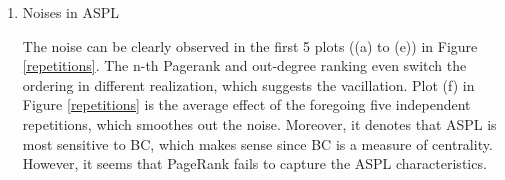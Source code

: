 \documentclass{article}
\begin{document}
\begin{enumerate}
\item Noises in ASPL\\

\par The noise can be clearly observed in the first 5 plots ((a) to (e)) in Figure \ref{repetitions}. The n-th Pagerank and out-degree ranking even switch the ordering in different realization, which suggests the vacillation.  Plot (f) in Figure  \ref{repetitions} is the average effect of the foregoing five independent repetitions, which smoothes out the noise. Moreover, it denotes that ASPL is most sensitive to BC, which makes sense since BC is a measure of centrality. However, it seems that PageRank fails to capture the ASPL characteristics. \\


\end{enumerate}
\end{document}
